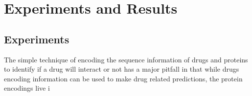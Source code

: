 \chapter{Experiments and Results}


\section{Experiments}

The simple technique of encoding the sequence information of drugs and proteins to identify if a drug will interact or not has a major pitfall in that while drugs encoding information can be used to make drug related predictions, the protein encodings live i


